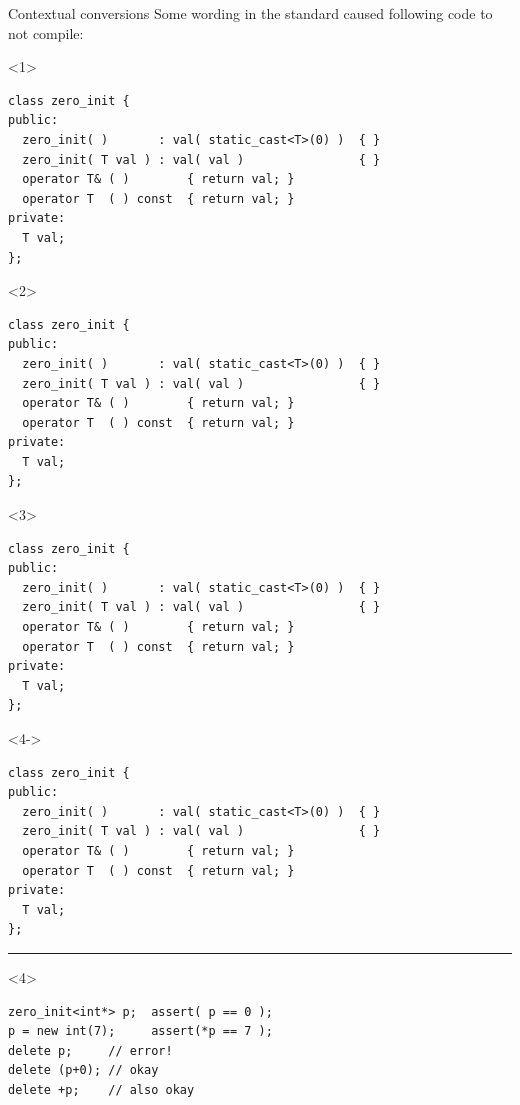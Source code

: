 \documentclass[10pt]{beamer}
\begin{document}
\begin{frame}[fragile]{Contextual conversions}
	Some wording in the standard caused following code to not compile:

	\begin{onlyenv}
	\begin{verbatim}
class zero_init {
public:
  zero_init( )       : val( static_cast<T>(0) )  { }
  zero_init( T val ) : val( val )                { }
  operator T& ( )        { return val; }
  operator T  ( ) const  { return val; }
private:
  T val;
};
	\end{verbatim}
	\end{onlyenv}

	\begin{onlyenv}
	\begin{verbatim}
class zero_init {
public:
  zero_init( )       : val( static_cast<T>(0) )  { }
  zero_init( T val ) : val( val )                { }
  operator T& ( )        { return val; }
  operator T  ( ) const  { return val; }
private:
  T val;
};
	\end{verbatim}
	\end{onlyenv}

	\begin{onlyenv}
	\begin{verbatim}
class zero_init {
public:
  zero_init( )       : val( static_cast<T>(0) )  { }
  zero_init( T val ) : val( val )                { }
  operator T& ( )        { return val; }
  operator T  ( ) const  { return val; }
private:
  T val;
};
	\end{verbatim}
	\end{onlyenv}

	\begin{onlyenv}<4->
	\begin{verbatim}
class zero_init {
public:
  zero_init( )       : val( static_cast<T>(0) )  { }
  zero_init( T val ) : val( val )                { }
  operator T& ( )        { return val; }
  operator T  ( ) const  { return val; }
private:
  T val;
};

	\end{verbatim}
\hrule
	\end{onlyenv}

	\begin{onlyenv}
	\begin{verbatim}
zero_init<int*> p;  assert( p == 0 );
p = new int(7);     assert(*p == 7 );
delete p;     // error!
delete (p+0); // okay
delete +p;    // also okay
	\end{verbatim}
	\end{onlyenv}


\end{frame}
\end{document}
